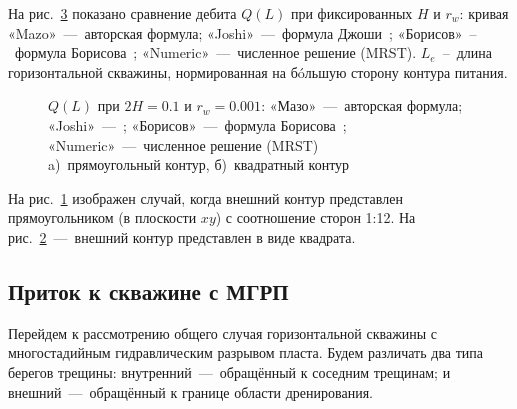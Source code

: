 \documentclass{article}
\begin{document}
На рис.~\ref{fig:kham_compare_hw_models} показано сравнение дебита $Q(L)$ при фиксированных $H$ и $r_w$:
кривая «Mazo»~---~авторская формула; «Joshi»~---~формула Джоши~\cite{lit:kham_joshi1988};
«Борисов»~--~формула Борисова~\cite{lit:kham_borisov_1984}; «Numeric»~---~численное решение (MRST). $L_e$~--~длина 
горизонтальной скважины, нормированная на б\'{o}льшую сторону контура питания.

\begin{figure}[H]
	\centering
	\begin{subfigure}{0.48\textwidth}
		\centering
		
		\caption{}
		\label{fig:kham_compare_hw_models_rectangle_area}
	\end{subfigure}
	\hfill
	\begin{subfigure}{0.48\textwidth}
		\centering
		
		\caption{}
		\label{fig:kham_compare_hw_models_square_area}
	\end{subfigure}
	\caption{
		$Q(L)$ при $2H=0.1$ и $r_w=0.001$: «Мазо»~---~авторская формула; «Joshi»~---~\cite{lit:kham_joshi1988};
		«Борисов»~---~формула Борисова~\cite{lit:kham_borisov_1984}; «Numeric»~---~численное решение (MRST) \\
		a)~прямоугольный контур, б)~квадратный контур
	}
	\label{fig:kham_compare_hw_models}
\end{figure}

На рис.~\ref{fig:kham_compare_hw_models_rectangle_area} изображен случай, когда внешний контур представлен прямоугольником (в плоскости $xy$)
с соотношение сторон 1:12. На рис.~\ref{fig:kham_compare_hw_models_square_area}~---~внешний контур представлен в виде квадрата.


\subsection{Приток к скважине с МГРП}
Перейдем к рассмотрению общего случая горизонтальной скважины с многостадийным гидравлическим разрывом пласта.
Будем различать два типа берегов трещины: внутренний~---~обращённый к соседним трещинам;
и внешний~---~обращённый к границе области дренирования.
\end{document}
